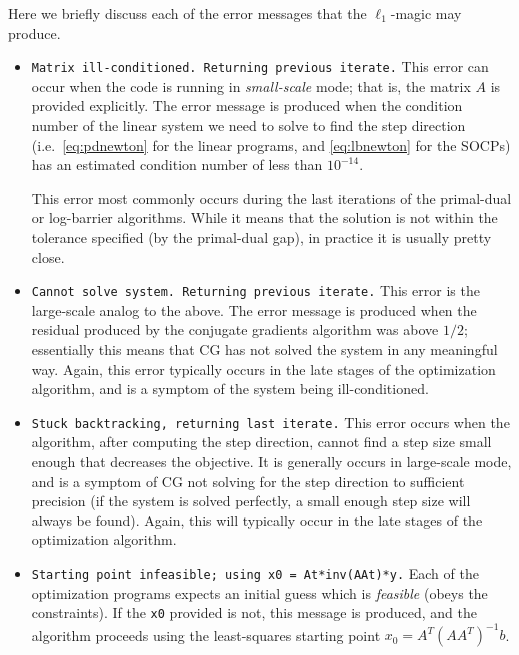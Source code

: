 \documentclass{article}
\newcommand{\<}{\langle}
\renewcommand{\>}{\rangle}
\begin{document}
Here we briefly discuss each of the error messages that the $\ell_1$-{\sc magic} may produce.

\begin{itemize}
%
\item \texttt{Matrix ill-conditioned.  Returning previous iterate.}  
This error can occur when the code is running in {\em small-scale} mode; that is, the matrix $A$ is provided explicitly.  The error message is produced when the condition number of the 
linear system we need to solve to find the step direction (i.e.\ \eqref{eq:pdnewton} for the linear programs, and \eqref{eq:lbnewton} for the SOCPs) has an estimated condition number of less than $10^{-14}$.  

This error most commonly occurs during the last iterations of the primal-dual or log-barrier algorithms.  While it means that the solution is not within the tolerance specified (by the primal-dual gap), in practice it is usually pretty close.
%
\item  \texttt{Cannot solve system.  Returning previous iterate.}
This error is the large-scale analog to the above.  The error message is produced when the residual produced by the conjugate gradients algorithm was above $1/2$; essentially this means that CG has not solved the system in any meaningful way.  Again, this error typically occurs in the late stages of the optimization algorithm, and is a symptom of the system being ill-conditioned.
%
\item \texttt{Stuck backtracking, returning last iterate.}
This error occurs when the algorithm, after computing the step direction, cannot find a step size small enough that decreases the objective.  It is generally occurs in large-scale mode, and is a symptom of CG not solving for the step direction to sufficient precision (if the system is solved perfectly, a small enough step size will always be found).  Again, this will typically occur in the late stages of the optimization algorithm.
%
\item \texttt{Starting point infeasible; using x0 = At*inv(AAt)*y.}
Each of the optimization programs expects an initial guess which is {\em feasible} (obeys the constraints).  If the \texttt{x0} provided is not, this message is produced, and the algorithm proceeds using the least-squares starting point $x_0 = A^T(AA^T)^{-1}b$.
%
\end{itemize}

\end{document}
